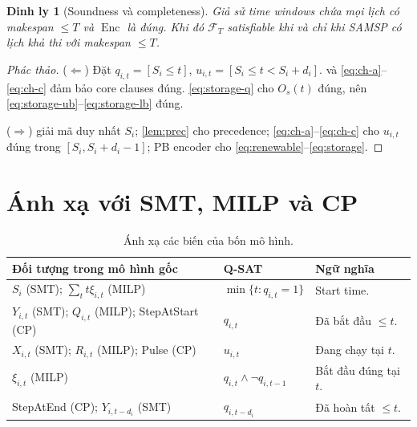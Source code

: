 \documentclass[11pt,a4paper]{article}
\newtheorem{theorem}{Dinh ly}[section]
\theoremstyle{remark}
\begin{document}
\begin{theorem}[Soundness và completeness]
\label{thm:correct}
Giả sử time windows chứa mọi lịch có makespan $\le T$ và
$\operatorname{Enc}$ là đúng. Khi đó $\mathcal{F}_T$ satisfiable khi và chỉ
khi SAMSP có lịch khả thi với makespan $\le T$.
\end{theorem}

\begin{proof}[Phác thảo]
($\Leftarrow$) Đặt $q_{i,t} = [S_i \le t]$, $u_{i,t} = [S_i \le t < S_i+d_i]$.
 và \eqref{eq:ch-a}--\eqref{eq:ch-c} đảm bảo core clauses đúng.
\eqref{eq:storage-q} cho $O_s(t)$ đúng, nên \eqref{eq:storage-ub}--\eqref{eq:storage-lb} đúng.

($\Rightarrow$)  giải mã duy nhất $S_i$;
\cref{lem:prec} cho precedence; \eqref{eq:ch-a}--\eqref{eq:ch-c} cho $u_{i,t}$
đúng trong $[S_i, S_i+d_i-1]$; PB encoder cho \eqref{eq:renewable}--\eqref{eq:storage}.
\end{proof}

\section{Ánh xạ với SMT, MILP và CP}
\label{sec:map}

\begin{table}[htbp]
\centering
\caption{Ánh xạ các biến của bốn mô hình.}
\label{tab:map}
\begin{tabularx}{\textwidth}{@{}p{}p{}Y@{}}
\toprule
\textbf{Đối tượng trong mô hình gốc} & \textbf{Q-SAT} & \textbf{Ngữ nghĩa}\\
\midrule
$S_i$ (SMT); $\sum_t t\xi_{i,t}$ (MILP) & $\min\{t : q_{i,t}=1\}$ & Start time.\\
$Y_{i,t}$ (SMT); $Q_{i,t}$ (MILP); StepAtStart (CP) & $q_{i,t}$ & Đã bắt đầu $\le t$.\\
$X_{i,t}$ (SMT); $R_{i,t}$ (MILP); Pulse (CP) & $u_{i,t}$ & Đang chạy tại $t$.\\
$\xi_{i,t}$ (MILP) & $q_{i,t} \land \neg q_{i,t-1}$ & Bắt đầu đúng tại $t$.\\
StepAtEnd (CP); $Y_{i,t-d_i}$ (SMT) & $q_{i,t-d_i}$ & Đã hoàn tất $\le t$.\\
\bottomrule
\end{tabularx}
\end{table}
\end{document}
